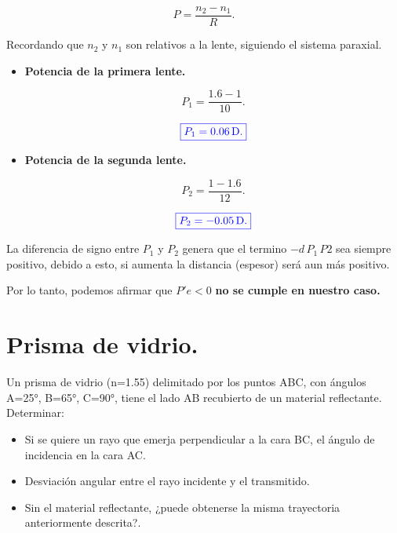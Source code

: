 \documentclass[a4paper,12pt]{article} %
\begin{document}
\[P = \frac{n_2 - n_1}{R}.\]

\begin{justify}
	Recordando que \(n_2\) y \(n_1\) son relativos a la lente, siguiendo el sistema paraxial.
\end{justify}

\begin{itemize}
	\item \textbf{Potencia de la primera lente.}
	
	\[ P_1 = \frac{1.6 - 1}{10}. \]

	\[ \textcolor{blue}{\boxed{P_1 = 0.06 \, \mathrm{D}.}} \]

	\item \textbf{Potencia de la segunda lente.}
	
	\[ P_2 = \frac{1 - 1.6}{12}. \]

	\[ \textcolor{blue}{\boxed{P_2 = -0.05 \, \mathrm{D}.}} \]
\end{itemize}

\begin{justify}
	La diferencia de signo entre \(P_1\) y \(P_2\) genera que el termino \(- d \, P_1 \, P2\) sea siempre positivo, debido a esto, si aumenta la distancia (espesor) será aun más positivo.
\end{justify}

\begin{justify}
	Por lo tanto, podemos afirmar que \(P'e < 0\) \textbf{no se cumple en nuestro caso.}
\end{justify}

\vspace{\baselineskip}

\section{Prisma de vidrio.}

\begin{justify}
	Un prisma de vidrio (n=1.55) delimitado por los puntos ABC, con ángulos A=25°, B=65°, C=90°, tiene el lado AB recubierto de un material reflectante. Determinar:
\end{justify}

\begin{itemize}
	\item Si se quiere un rayo que emerja perpendicular a la cara BC, el ángulo de incidencia en la cara AC.
	\item Desviación angular entre el rayo incidente y el transmitido. 
	\item Sin el material reflectante, ¿puede obtenerse la misma trayectoria anteriormente descrita?.
\end{itemize}
\end{document}
